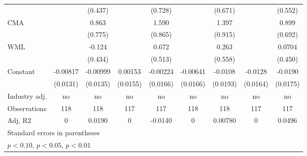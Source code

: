 {\begin{tabular}{l*{8}{c}}
                    &                     &     (0.437)         &                     &     (0.728)         &                     &     (0.671)         &                     &     (0.552)         \\
CMA                 &                     &       0.863         &                     &       1.590\sym{*}  &                     &       1.397         &                     &       0.899         \\
                    &                     &     (0.775)         &                     &     (0.865)         &                     &     (0.915)         &                     &     (0.692)         \\
WML                 &                     &      -0.124         &                     &       0.672         &                     &       0.263         &                     &      0.0704         \\
                    &                     &     (0.434)         &                     &     (0.513)         &                     &     (0.558)         &                     &     (0.450)         \\
Constant            &    -0.00817         &    -0.00999         &     0.00153         &    -0.00224         &    -0.00641         &     -0.0108         &     -0.0128         &     -0.0190         \\
                    &    (0.0131)         &    (0.0135)         &    (0.0155)         &    (0.0166)         &    (0.0166)         &    (0.0193)         &    (0.0164)         &    (0.0175)         \\
\hline
Industry adj.       &          no         &          no         &          no         &          no         &          no         &          no         &          no         &          no         \\
Observations        &         118         &         118         &         117         &         117         &         118         &         118         &         117         &         117         \\
Adj, R2             &           0         &      0.0190         &           0         &     -0.0140         &           0         &     0.00780         &           0         &      0.0496         \\
\hline\hline
\multicolumn{9}{l}{\footnotesize Standard errors in parentheses}\\
\multicolumn{9}{l}{\footnotesize \sym{*} \(p<0.10\), \sym{**} \(p<0.05\), \sym{***} \(p<0.01\)}\\
\end{tabular}
}
